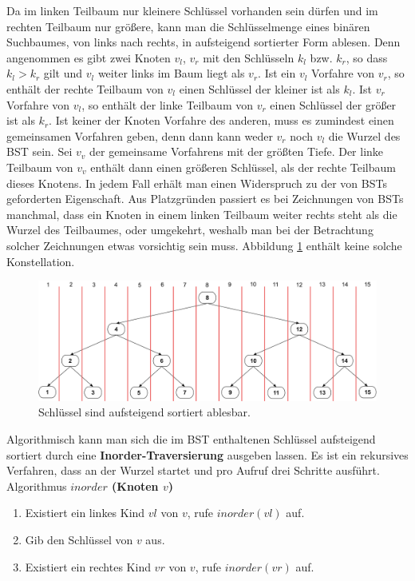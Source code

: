 \documentclass[a4paper,12pt]{article}
\begin{document}
\noindent Da im linken Teilbaum nur kleinere Schlüssel vorhanden sein dürfen und im rechten Teilbaum nur größere, kann man die Schlüsselmenge eines binären Suchbaumes, von links nach rechts, in aufsteigend sortierter Form ablesen. Denn angenommen es gibt zwei Knoten $v_l$, $v_r$ mit den Schlüsseln $k_l$ bzw. $k_r$, so dass $k_l > k_r$ gilt und $v_l$ weiter links im Baum liegt als $v_r$. Ist ein $v_l$ Vorfahre von $v_r$, so enthält der rechte Teilbaum von $v_l$ einen Schlüssel der kleiner ist als $k_l$. Ist $v_r$ Vorfahre von $v_l$, so enthält der linke Teilbaum von $v_r$ einen Schlüssel der größer ist als $k_r$. Ist keiner der Knoten Vorfahre des anderen, muss es zumindest einen gemeinsamen Vorfahren geben, denn dann kann weder $v_r$ noch $v_l$ die Wurzel des BST sein. Sei $v_v$ der gemeinsame Vorfahrens mit der größten Tiefe. Der linke Teilbaum von $v_v$ enthält dann einen größeren Schlüssel, als der rechte Teilbaum dieses Knotens. In jedem Fall erhält man einen Widerspruch zu der von BSTs geforderten Eigenschaft. Aus Platzgründen passiert es bei Zeichnungen von BSTs manchmal, dass ein Knoten in einem linken Teilbaum weiter rechts steht als die Wurzel des Teilbaumes, oder umgekehrt, weshalb man bei der Betrachtung solcher Zeichnungen etwas vorsichtig sein muss. Abbildung \ref{fig:linksRechts} enthält keine solche Konstellation.  

\begin{figure}[h]
	\centering
	\includegraphics[width= 1\textwidth]{"Medien/Einleitung/linksRechts"}
	\caption{Schlüssel sind aufsteigend sortiert ablesbar. }
	\label{fig:linksRechts}
\end{figure}
\noindent Algorithmisch kann man sich die im BST enthaltenen Schlüssel aufsteigend sortiert durch eine \textbf{Inorder-Traversierung} ausgeben lassen. Es ist ein rekursives Verfahren, dass an der Wurzel startet und pro Aufruf drei Schritte ausführt.\\

Algorithmus \textbf{$\mathit{inorder}$ (Knoten $v$)}
\begin{enumerate}
	\item Existiert ein linkes Kind $\mathit{vl}$ von $v$, rufe $\mathit{inorder(vl)}$ auf. 
	\item Gib den Schlüssel von $v$ aus. 
	\item Existiert ein rechtes Kind $\mathit{vr}$ von $v$, rufe $\mathit{inorder(vr)}$ auf. 
\end{enumerate}
\end{document}
